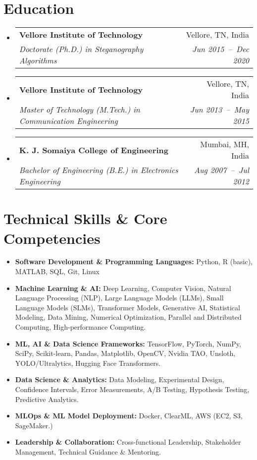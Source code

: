 \documentclass[a4paper,11pt]{article}
\makeatletter
\newcommand{\resumeSubheading}[4]{
  \vspace{-1pt}\item
    \begin{tabular*}{0.97\textwidth}[t]{l@{\extracolsep{\fill}}r}
      \textbf{#1} & #2 \\
      \textit{\small#3} & \textit{\small #4} \\
    \end{tabular*}\vspace{-5pt}
}
\newcommand{\resumeSubHeadingListStart}{\begin{itemize}[leftmargin=*]}
\newcommand{\resumeSubHeadingListEnd}{\end{itemize}}
\makeatother
\begin{document}
\section{Education}
  \resumeSubHeadingListStart
    \resumeSubheading
      {Vellore Institute of Technology}{Vellore, TN, India}
      {Doctorate (Ph.D.) in Steganography Algorithms}{Jun 2015~--~Dec 2020}
    \resumeSubheading
      {Vellore Institute of Technology}{Vellore, TN, India}
      {Master of Technology (M.Tech.) in Communication Engineering}{Jun 2013~--~May 2015}
    \resumeSubheading
      {K. J. Somaiya College of Engineering}{Mumbai, MH, India}
      {Bachelor of Engineering (B.E.) in Electronics Engineering}{Aug 2007~--~Jul 2012}
  \resumeSubHeadingListEnd

\section{Technical Skills \& Core Competencies}
	\begin{itemize}[leftmargin=*, itemsep = -2pt]
    \item{\textbf{Software Development \& Programming Languages:} Python, R (basic), MATLAB, SQL, Git, Linux}
    \item{\textbf{Machine Learning \& AI:} Deep Learning, Computer Vision, Natural Language Processing (NLP), Large Language Models (LLMs), Small Language Models (SLMs), Transformer Models, Generative AI, Statistical Modeling, Data Mining, Numerical Optimization, Parallel and Distributed Computing, High-performance Computing.} 
		\item{\textbf{ML, AI \& Data Science Frameworks:} TensorFlow, PyTorch, NumPy, SciPy, Scikit-learn, Pandas, Matplotlib, OpenCV, Nvidia TAO, Unsloth, YOLO/Ultralytics, Hugging Face Transformers.}
		\item {\textbf{Data Science \& Analytics:} Data Modeling, Experimental Design, Confidence Intervals, Error Measurements, A/B Testing, Hypothesis Testing, Predictive Analytics.}
		\item{\textbf{MLOps \& ML Model Deployment:} Docker, ClearML, AWS (EC2, S3, SageMaker.)}
    \item{\textbf{Leadership \& Collaboration:} Cross-functional Leadership, Stakeholder Management, Technical Guidance \& Mentoring.}
    
	\end{itemize}

\end{document}

